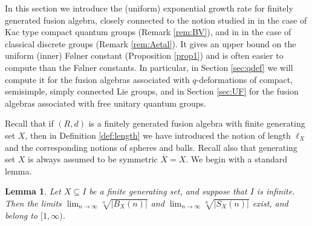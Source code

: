 \documentclass[11 pt, leqno]{amsart}
\newcommand{\ov}{\overline}
\newtheorem{lemma}[theorem]{Lemma}
\theoremstyle{definition}
\numberwithin{equation}{section}
\begin{document}
In this section we introduce the (uniform) exponential growth rate for finitely generated fusion algebra, closely connected to the notion studied in \cite{BanicaVergnioux} in the case of Kac type compact quantum groups (Remark \ref{rem:BV}), and in \cite{Arzhantseva} in the case of classical discrete groups (Remark \ref{rem:Aetal}). It gives an upper bound on the uniform (inner) F\o lner constant (Proposition \ref{prop1}) and is often easier to compute than the F\o lner constants. In particular, in Section \ref{sec:qdef} we will compute it for the fusion algebras associated with %
$q$-deformations of compact, semisimple, simply connected Lie groups, and in Section \ref{sec:UF} for the fusion algebras associated with free unitary quantum groups.

Recall that if $(R,d)$ is a finitely generated fusion algebra with finite generating set $X$, then in Definition \ref{def:length} we have introduced the notion of length $\ell_X$ and the corresponding notions of spheres and balls. Recall also that generating set $X$ is always assumed to be symmetric $\ov{X}=X$. We begin with a standard lemma.

\begin{lemma}\label{lemma2}
Let $X\subseteq I$ be a finite generating set, and suppose that $I$ is infinite. Then the limits $ \lim_{n\to\infty} \sqrt[n]{|B_X(n)|}$ and $ \lim_{n\to\infty} \sqrt[n]{|S_X(n)|}$ exist, and belong  to $ [1, \infty)$.
\end{lemma}
\end{document}
